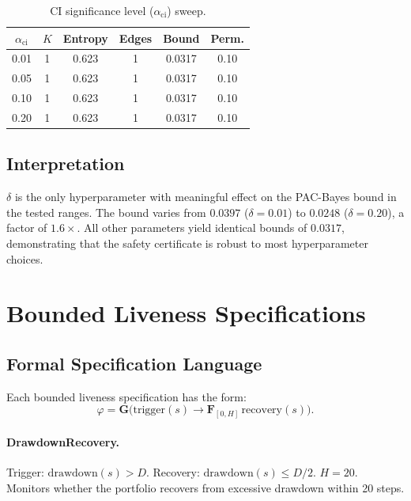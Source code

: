 \documentclass[11pt]{article}
\begin{document}
\begin{table}[h]
\centering
\caption{CI significance level
($\alpha_{\mathrm{ci}}$) sweep.}\label{tab:cisweep}
\small
\begin{tabular}{@{}cccccc@{}}
\toprule
$\alpha_{\mathrm{ci}}$ & $K$ & Entropy & Edges
  & Bound & Perm. \\
\midrule
0.01 & 1 & 0.623 & 1 & 0.0317 & 0.10 \\
0.05 & 1 & 0.623 & 1 & 0.0317 & 0.10 \\
0.10 & 1 & 0.623 & 1 & 0.0317 & 0.10 \\
0.20 & 1 & 0.623 & 1 & 0.0317 & 0.10 \\
\bottomrule
\end{tabular}
\end{table}

\subsection{Interpretation}

$\delta$ is the only hyperparameter with meaningful effect on the
PAC-Bayes bound in the tested ranges.  The bound varies from $0.0397$
($\delta = 0.01$) to $0.0248$ ($\delta = 0.20$), a factor of
$1.6\times$.  All other parameters yield identical bounds of $0.0317$,
demonstrating that the safety certificate is robust to most
hyperparameter choices.


\section{Bounded Liveness Specifications}\label{app:liveness}

\subsection{Formal Specification Language}

Each bounded liveness specification has the form:
\begin{equation}
  \varphi = \mathbf{G}\bigl(\text{trigger}(s) \to
  \mathbf{F}_{[0,H]}\,\text{recovery}(s)\bigr).
\end{equation}

\paragraph{DrawdownRecovery.}
Trigger: $\mathrm{drawdown}(s) > D$.  Recovery:
$\mathrm{drawdown}(s) \leq D/2$.  $H = 20$.  Monitors whether the
portfolio recovers from excessive drawdown within 20 steps.
\end{document}
